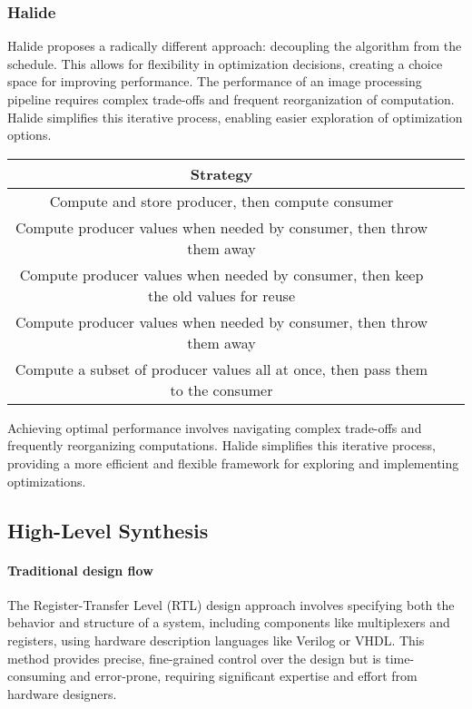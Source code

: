 \subsubsection{Halide}
Halide proposes a radically different approach: decoupling the algorithm from the schedule. 
This allows for flexibility in optimization decisions, creating a choice space for improving performance. 
The performance of an image processing pipeline requires complex trade-offs and frequent reorganization of computation. 
Halide simplifies this iterative process, enabling easier exploration of optimization options.
\renewcommand*{\arraystretch}{2}
\begin{table}[H]
    \centering
    \begin{tabular}{|c|c|c|}
    \hline
    \textbf{Strategy}  \\ \hline
    Compute and store producer, then compute consumer \\ \hline
    Compute producer values when needed by consumer, then throw them away \\ \hline
    Compute producer values when needed by consumer, then keep the old values for reuse  \\ \hline
    Compute producer values when needed by consumer, then throw them away  \\ \hline
    Compute a subset of producer values all at once, then pass them to the consumer  \\ \hline
    \end{tabular}
\end{table}

Achieving optimal performance involves navigating complex trade-offs and frequently reorganizing computations. 
Halide simplifies this iterative process, providing a more efficient and flexible framework for exploring and implementing optimizations.

\subsection{High-Level Synthesis}
\paragraph*{Traditional design flow}
The Register-Transfer Level (RTL) design approach involves specifying both the behavior and structure of a system, including components like multiplexers and registers, using hardware description languages like Verilog or VHDL. 
This method provides precise, fine-grained control over the design but is time-consuming and error-prone, requiring significant expertise and effort from hardware designers.

